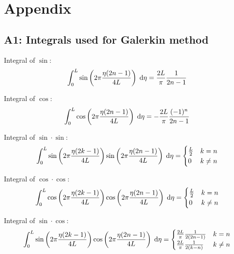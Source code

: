 \chapter*{Appendix}

\section*{A1: Integrals used for Galerkin method}

Integral of $\sin$:
~
\begin{equation*}
    \int^L_0 \sin\left( 2 \pi \frac{\eta (2 n - 1)}{4 L} \right) \;\mathrm{d}\eta = 
    \frac{2 L}{\pi} \frac{1}{2n-1}
\end{equation*}

Integral of $\cos$:
~
\begin{equation*}
    \int^L_0 \cos\left( 2 \pi \frac{\eta (2 n - 1)}{4 L} \right) \;\mathrm{d}\eta = 
    - \frac{2 L}{\pi} \frac{(-1)^n}{2n-1}
\end{equation*}

Integral of $\sin \cdot \sin$:
~
\begin{equation*}
    \int^L_0 \sin\left( 2 \pi \frac{\eta (2 k - 1)}{4 L} \right) \sin\left( 2 \pi \frac{\eta (2 n - 1)}{4 L} \right) \;\mathrm{d}\eta = 
    \begin{cases}
        \frac{L}{2} & k = n \\
        0 & k \neq n
    \end{cases}
\end{equation*}

Integral of $\cos \cdot \cos$:
~
\begin{equation*}
    \int^L_0 \cos\left( 2 \pi \frac{\eta (2 k - 1)}{4 L} \right) \cos\left( 2 \pi \frac{\eta (2 n - 1)}{4 L} \right) \;\mathrm{d}\eta = 
    \begin{cases}
        \frac{L}{2} & k = n \\
        0 & k \neq n
    \end{cases}
\end{equation*}

Integral of $\sin \cdot \cos$:
~
\begin{equation*}
    \int^L_0 \sin\left( 2 \pi \frac{\eta (2 k - 1)}{4 L} \right) \cos\left( 2 \pi \frac{\eta (2 n - 1)}{4 L} \right) \;\mathrm{d}\eta = 
    \begin{cases}
        \frac{2 L}{\pi} \frac{1}{2(2n-1)} & k = n \\
        \frac{2 L}{\pi} \frac{1}{2(k-n)} & k \neq n
    \end{cases}
\end{equation*}

